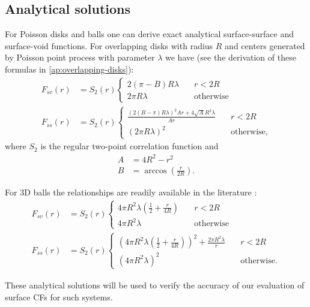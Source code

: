 \documentclass[reprint,amsmath,amssymb,aps,pre,showkeys,showpacs]{revtex4-1}
\begin{document}
\subsection{Analytical solutions}
For Poisson disks and balls one can derive exact analytical surface-surface and
surface-void functions. For overlapping disks with radius $R$ and centers
generated by Poisson point process with parameter $\lambda$ we have (see the
derivation of these formulas in \cref{ap:overlapping-disks}):
\begin{align}
  F_{sv}(r) &= S_2(r) \left\{
  \begin{array}{ll}
    2(\pi - B)R \lambda & \quad r<2R \\
    2\pi R \lambda & \quad \text{otherwise}
  \end{array} \right. \label{eq:fsv_final} \\
  F_{ss}(r) &= S_2(r) \left\{
  \begin{array}{ll}
    \frac{(2(B-\pi)R\lambda)^2Ar + 4\sqrt{A}R^2\lambda}{Ar} & \quad r<2R \\
    (2\pi R\lambda)^2 & \quad \text{otherwise},
  \end{array} \right. \label{eq:fss_final}
\end{align}
where $S_2$ is the regular two-point correlation function and
\begin{align*}
  A &= 4R^2 - r^2 \\
  B &= \arccos(\frac{r}{2R}).
\end{align*}

For 3D balls the relationships are readily available in the literature
\cite{Torquato_book,ma2018SS}:
\begin{align*}
  F_{sv}(r) &= S_2(r) \left\{
  \begin{array}{ll}
    4\pi R^2\lambda(\frac{1}{2} + \frac{r}{4R}) & \quad r<2R \\
    4\pi R^2\lambda & \quad \text{otherwise}
  \end{array} \right. \\
  F_{ss}(r) &= S_2(r) \left\{
  \begin{array}{ll}
    {(4\pi R^2 \lambda (\frac{1}{2} + \frac{r}{4R}))^2 + \frac{2\pi R^2 \lambda}{r}} & \quad r<2R \\
    (4\pi R^2 \lambda)^2 & \quad \text{otherwise}.
  \end{array} \right.
\end{align*}

These analytical solutions will be used to verify the accuracy of our evaluation
of surface CFs for such systems.
\end{document}
